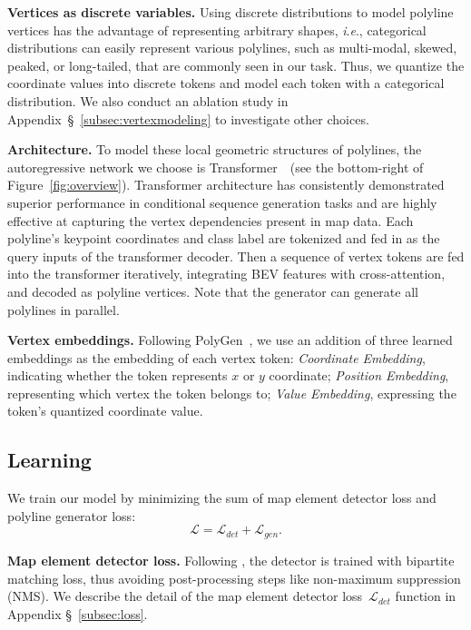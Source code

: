 \documentclass{article}
\newcommand{\ie}{\textit{i}.\textit{e}., }
\theoremstyle{plain}
\theoremstyle{definition}
\theoremstyle{remark}
\begin{document}
\noindent\textbf{Vertices as discrete variables.} 
Using discrete distributions to model polyline vertices has the advantage of representing arbitrary shapes, \ie categorical distributions can easily represent various polylines, such as multi-modal, skewed, peaked, or long-tailed, that are commonly seen in our task. 
Thus, we quantize the coordinate values into discrete tokens and model each token with a categorical distribution.
We also conduct an ablation study in Appendix~\S~\ref{subsec:vertexmodeling} to investigate other choices.

\noindent\textbf{Architecture.}
To model these local geometric structures of polylines, the autoregressive network we choose is Transformer~\citep{vaswani2017attention}~(see the bottom-right of Figure~\ref{fig:overview}). Transformer architecture has consistently demonstrated superior performance in conditional sequence generation tasks and are highly effective at capturing the vertex dependencies present in map data. Each polyline's keypoint coordinates and class label are tokenized and fed in as the query inputs of the transformer decoder. Then a sequence of vertex tokens are fed into the transformer iteratively, integrating BEV features with cross-attention, and decoded as polyline vertices. Note that the generator can generate all polylines in parallel. 

\noindent\textbf{Vertex embeddings.} 
Following PolyGen~\citep{nash2020polygen}, we use an addition of three learned embeddings as the embedding of each vertex token: \textit{Coordinate Embedding}, indicating whether the token represents $x$ or $y$ coordinate; \textit{Position Embedding}, representing which vertex the token belongs to; \textit{Value Embedding}, expressing the token's quantized coordinate value. 



\subsection{Learning}
\label{subsec:learning}
We train our model by minimizing the sum of map element detector loss and polyline generator loss:
\begin{equation}
    \mathcal{L} = \mathcal{L}_{det} + \mathcal{L}_{gen}.
    \label{eq:total_loss}
\end{equation}

\noindent\textbf{Map element detector loss.} 
 Following \citep{wang2022detr3d, zhu2020deformable}, the detector is trained with bipartite matching loss, thus avoiding post-processing steps like non-maximum suppression (NMS). We describe the detail of the map element detector loss~$\mathcal{L}_{det}$ function in Appendix \S~\ref{subsec:loss}.
 
\end{document}
